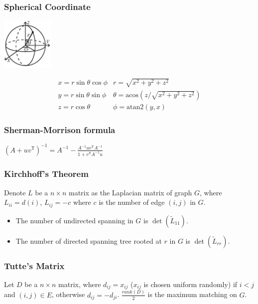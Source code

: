 \subsubsection{Spherical Coordinate}

\begin{center}
\includegraphics[width=25mm]{../codes/Misc/sphericalCoordinates.pdf}
\end{center}
\[\begin{array}{cc}
x = r\sin\theta\cos\phi & r = \sqrt{x^2+y^2+z^2}\\
y = r\sin\theta\sin\phi & \theta = \textrm{acos}(z/\sqrt{x^2+y^2+z^2})\\
z = r\cos\theta & \phi = \textrm{atan2}(y,x)
\end{array}\]

\subsubsection{Sherman-Morrison formula}
$\left(A + uv^\textsf{T}\right)^{-1} = A^{-1} - \frac{A^{-1}uv^\textsf{T}A^{-1}}{1 + v^\textsf{T}A^{-1}u}$

\subsubsection{Kirchhoff's Theorem}
Denote $L$ be a $n \times n$ matrix as the Laplacian matrix of graph $G$, where $L_{ii} = d(i)$, $L_{ij} = -c$ where $c$ is the number of edge $(i, j)$ in $G$.
\begin{itemize}[nosep]
    \item The number of undirected spanning in $G$ is $\det(\tilde{L}_{11})$.
    \item The number of directed spanning tree rooted at $r$ in $G$ is $\det(\tilde{L}_{rr})$.
\end{itemize}

\subsubsection{Tutte's Matrix}
Let $D$ be a $n \times n$ matrix, where $d_{ij} = x_{ij}$ ($x_{ij}$ is chosen uniform randomly) if $i < j$ and $(i, j) \in E$, otherwise $d_{ij} = -d_{ji}$. $\frac{rank(D)}{2}$ is the maximum matching on $G$.

